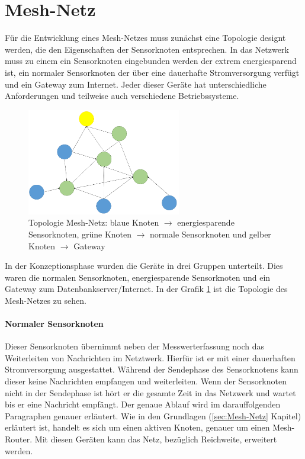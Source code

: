 \section{Mesh-Netz}
\label{sec:KonzeptionMeshNetz}
Für die Entwicklung eines Mesh-Netzes muss zunächst eine Topologie designt werden, die den Eigenschaften der Sensorknoten entsprechen. In das Netzwerk muss zu einem ein Sensorknoten eingebunden werden der extrem energiesparend ist, ein normaler Sensorknoten der über eine dauerhafte Stromversorgung verfügt und ein Gateway zum Internet. Jeder dieser Geräte hat unterschiedliche Anforderungen und teilweise auch verschiedene Betriebssysteme. 
\begin{figure}
	\centering
	\includegraphics[width=0.6\textwidth]{bilder/konzeptionMeshTopologie}
	\caption[Topologie Mesh-Netz]{Topologie Mesh-Netz: blaue Knoten $\rightarrow$ energiesparende Sensorknoten, grüne Knoten $\rightarrow$ normale Sensorknoten und gelber Knoten $\rightarrow$ Gateway}
	\label{img:konzeptionTopologie}
\end{figure}

In der Konzeptionsphase wurden die Geräte in drei Gruppen unterteilt. Dies waren die normalen Sensorknoten, energiesparende Sensorknoten und ein Gateway zum Datenbankserver/Internet. In der Grafik \ref{img:konzeptionTopologie} ist die Topologie des Mesh-Netzes zu sehen.
\paragraph{Normaler Sensorknoten} Dieser Sensorknoten übernimmt neben der Messwerterfassung noch das Weiterleiten von Nachrichten im Netztwerk. Hierfür ist er mit einer dauerhaften Stromversorgung ausgestattet. Während der Sendephase des Sensorknotens kann dieser keine Nachrichten empfangen und weiterleiten. Wenn der Sensorknoten nicht in der Sendephase ist hört er die gesamte Zeit in das Netzwerk und wartet bis er eine Nachricht empfängt. Der genaue Ablauf wird im darauffolgenden Paragraphen genauer erläutert. Wie in den Grundlagen (\ref{sec:Mesh-Netz} Kapitel) erläutert ist, handelt es sich um einen aktiven Knoten, genauer um einen Mesh-Router. Mit diesen Geräten kann das Netz, bezüglich Reichweite, erweitert werden.
